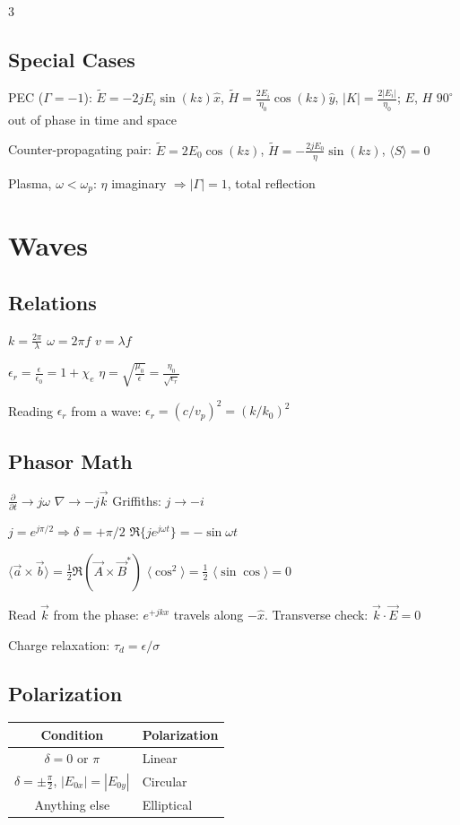 \documentclass[11pt]{article}
\newcommand{\warn}[1]{\textcolor{red!70!black}{#1}}
\begin{document}
\begin{multicols*}{3}
\subsection*{Special Cases}

PEC ($\Gamma=-1$): $\tilde E=-2jE_i\sin(kz)\hat x$, $\tilde H=\frac{2E_i}{\eta_0}\cos(kz)\hat y$, $|K|=\frac{2|E_i|}{\eta_0}$; $E$, $H$ $90^\circ$ out of phase in time and space

Counter-propagating pair: $\tilde E=2E_0\cos(kz)$, $\tilde H=-\frac{2jE_0}{\eta}\sin(kz)$, $\langle S\rangle=0$

Plasma, $\omega<\omega_p$: $\eta$ imaginary $\Rightarrow|\Gamma|=1$, total reflection

\section*{Waves}

\subsection*{Relations}

$k = \frac{2\pi}{\lambda}$ \hfill $\omega=2\pi f$ \hfill $v=\lambda f$

$\epsilon_r = \frac{\epsilon}{\epsilon_0}=1+\chi_e$ \hfill $\eta = \sqrt{\frac{\mu_0}{\epsilon}} = \frac{\eta_0}{\sqrt{\epsilon_r}}$

Reading $\epsilon_r$ from a wave: $\epsilon_r=(c/v_p)^2=(k/k_0)^2$

\subsection*{Phasor Math}

$\frac{\partial}{\partial t}\to j\omega$ \quad $\nabla\to-j\vec k$ \quad Griffiths: $j\to-i$

$j = e^{j\pi/2}\Rightarrow\delta=+\pi/2$ \hfill $\Re\{je^{j\omega t}\}=-\sin\omega t$

$\langle\vec a\times\vec b\rangle=\frac12\Re(\vec A\times\vec B^*)$ \hfill $\langle\cos^2\rangle=\frac12$ \hfill $\langle\sin\cos\rangle=0$

Read $\vec k$ from the phase: $e^{+jkx}$ travels along \warn{$-\hat x$}. Transverse check: $\vec k\cdot\vec E=0$

Charge relaxation: $\tau_d=\epsilon/\sigma$

\subsection*{Polarization}
{\small\begin{tabularx}{\linewidth}{|c|X|}
    \hline
    Condition & Polarization \\
    \hline
    $\delta=0$ or $\pi$ & Linear \\
    $\delta=\pm\frac{\pi}{2}$, $|E_{0x}|=|E_{0y}|$ & Circular \\
    Anything else & Elliptical \\
    \hline
\end{tabularx}}


\end{multicols*}
\end{document}
